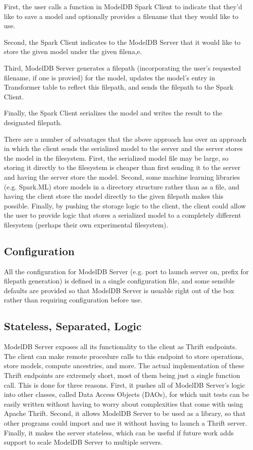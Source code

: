 First, the user calls a function in ModelDB Spark Client to indicate that they'd like to save a model and optionally
provides a filename that they would like to use.

Second, the Spark Client indicates to the ModelDB Server that it would like to store the given model under the
given filena,e.

Third, ModelDB Server generates a filepath (incorporating the user's requested filename, if one is provied)
for the model, updates the model's entry in Transformer table 
to reflect this filepath, and sends the filepath to the Spark Client.

Finally, the Spark Client serializes the model and writes the result to the designated filepath.

There are a number of advantages that the above approach has over an approach in which the client
sends the serialized model to the server and the server stores the model in the filesystem. First,
the serialized model file may be large, so storing it directly to the filesystem is cheaper than
first sending it to the server and having the server store the model. Second, some machine learning
libraries (e.g. Spark.ML) store models in a directory structure rather than as a file, and having the
client store the model directly to the given filepath makes this possible. Finally, by pushing the storage
logic to the client, the client could allow the user to provide logic that stores a serialized model
to a completely different filesystem (perhaps their own experimental filesystem). 

\subsection{Configuration}
All the configuration for ModelDB Server (e.g. port to launch server on, prefix for
filepath generation) is defined in a single configuration file, and some sensible defaults
are provided so that ModelDB Server is usuable right out of the box rather than requiring
configuration before use.

\subsection{Stateless, Separated, Logic}
ModelDB Server exposes all its functionality to the client as Thrift endpoints. The client
can make remote procedure calls to this endpoint to store operations, store models, compute 
ancestries, and more. The actual implementation of these Thrift endpoints are extremely short,
most of them being just a single function call. This is done for three reasons. First, it
pushes all of ModelDB Server's logic into other classes, called Data Access Objects (DAOs), 
for which unit tests can be easily written without having to worry about complexities that 
come with using Apache Thrift. Second, it allows ModelDB Server to be used as a library, 
so that other programs could import and use it without having to launch a Thrift server. 
Finally, it makes the server stateless, which can be useful if
future work adds support to scale ModelDB Server to multiple servers.

